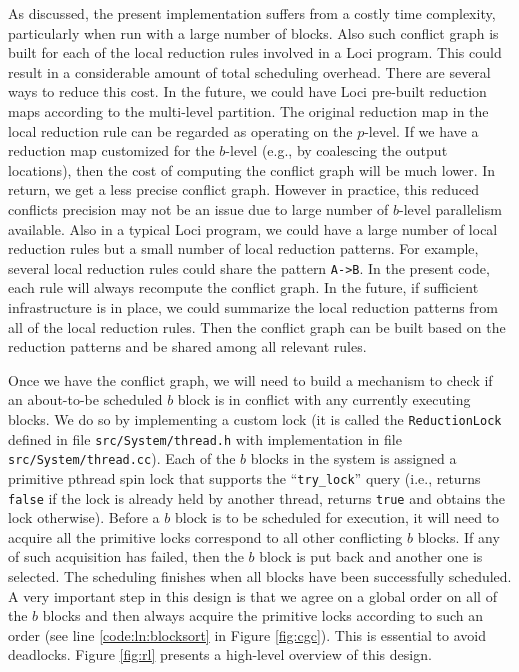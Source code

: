 \documentclass{article}
\begin{document}
As discussed, the present implementation suffers from a costly time
complexity, particularly when run with a large number of blocks.  Also
such conflict graph is built for each of the local reduction rules
involved in a Loci program.  This could result in a considerable amount
of total scheduling overhead.  There are several ways to reduce this
cost.  In the future, we could have Loci pre-built reduction maps
according to the multi-level partition.  The original reduction map in
the local reduction rule can be regarded as operating on the $p$-level.
If we have a reduction map customized for the $b$-level (e.g., by
coalescing the output locations), then the cost of computing the
conflict graph will be much lower.  In return, we get a less precise
conflict graph.  However in practice, this reduced conflicts precision
may not be an issue due to large number of $b$-level parallelism
available.  Also in a typical Loci program, we could have a large number
of local reduction rules but a small number of local reduction patterns.
For example, several local reduction rules could share the pattern
\texttt{A->B}.  In the present code, each rule will always recompute the
conflict graph.  In the future, if sufficient infrastructure is in
place, we could summarize the local reduction patterns from all of the
local reduction rules.  Then the conflict graph can be built based on
the reduction patterns and be shared among all relevant rules.

Once we have the conflict graph, we will need to build a mechanism to
check if an about-to-be scheduled $b$ block is in conflict with any
currently executing blocks.  We do so by implementing a custom lock (it
is called the \lstinline{ReductionLock} defined in file
\texttt{src/System/thread.h} with implementation in file
\texttt{src/System/thread.cc}).  Each of the $b$ blocks in the system is
assigned a primitive pthread spin lock that supports the
``\texttt{try\_lock}'' query (i.e., returns \lstinline{false} if the
lock is already held by another thread, returns \lstinline{true} and
obtains the lock otherwise).  Before a $b$ block is to be scheduled for
execution, it will need to acquire all the primitive locks correspond to
all other conflicting $b$ blocks.  If any of such acquisition has
failed, then the $b$ block is put back and another one is selected.  The
scheduling finishes when all blocks have been successfully scheduled.  A
very important step in this design is that we agree on a global order on
all of the $b$ blocks and then always acquire the primitive locks
according to such an order (see line \ref{code:ln:blocksort} in Figure
\ref{fig:cgc}).  This is essential to avoid deadlocks.  Figure
\ref{fig:rl} presents a high-level overview of this design.
\end{document}
